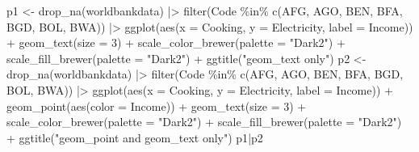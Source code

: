 \documentclass[
  letterpaper,
  DIV=11,
  numbers=noendperiod]{scrreprt}
\newenvironment{Shaded}{\begin{snugshade}}{\end{snugshade}}
\newcommand{\AttributeTok}[1]{\textcolor[rgb]{0.40,0.45,0.13}{#1}}
\newcommand{\DecValTok}[1]{\textcolor[rgb]{0.68,0.00,0.00}{#1}}
\newcommand{\FunctionTok}[1]{\textcolor[rgb]{0.28,0.35,0.67}{#1}}
\newcommand{\NormalTok}[1]{\textcolor[rgb]{0.00,0.23,0.31}{#1}}
\newcommand{\OtherTok}[1]{\textcolor[rgb]{0.00,0.23,0.31}{#1}}
\newcommand{\SpecialCharTok}[1]{\textcolor[rgb]{0.37,0.37,0.37}{#1}}
\newcommand{\StringTok}[1]{\textcolor[rgb]{0.13,0.47,0.30}{#1}}
\begin{document}
\begin{Shaded}
\begin{Highlighting}[]
\NormalTok{p1 }\OtherTok{\textless{}{-}} \FunctionTok{drop\_na}\NormalTok{(worldbankdata) }\SpecialCharTok{|\textgreater{}}
  \FunctionTok{filter}\NormalTok{(Code }\SpecialCharTok{\%in\%} \FunctionTok{c}\NormalTok{(}\StringTok{\textquotesingle{}AFG\textquotesingle{}}\NormalTok{, }\StringTok{\textquotesingle{}AGO\textquotesingle{}}\NormalTok{, }\StringTok{\textquotesingle{}BEN\textquotesingle{}}\NormalTok{, }\StringTok{\textquotesingle{}BFA\textquotesingle{}}\NormalTok{, }\StringTok{\textquotesingle{}BGD\textquotesingle{}}\NormalTok{, }\StringTok{\textquotesingle{}BOL\textquotesingle{}}\NormalTok{, }\StringTok{\textquotesingle{}BWA\textquotesingle{}}\NormalTok{)) }\SpecialCharTok{|\textgreater{}}
  \FunctionTok{ggplot}\NormalTok{(}\FunctionTok{aes}\NormalTok{(}\AttributeTok{x =}\NormalTok{ Cooking, }\AttributeTok{y =}\NormalTok{ Electricity, }\AttributeTok{label =}\NormalTok{ Income)) }\SpecialCharTok{+} \FunctionTok{geom\_text}\NormalTok{(}\AttributeTok{size =} \DecValTok{3}\NormalTok{) }\SpecialCharTok{+} \FunctionTok{scale\_color\_brewer}\NormalTok{(}\AttributeTok{palette =} \StringTok{"Dark2"}\NormalTok{) }\SpecialCharTok{+} \FunctionTok{scale\_fill\_brewer}\NormalTok{(}\AttributeTok{palette =} \StringTok{"Dark2"}\NormalTok{) }\SpecialCharTok{+} \FunctionTok{ggtitle}\NormalTok{(}\StringTok{"geom\_text only"}\NormalTok{)}
\NormalTok{p2 }\OtherTok{\textless{}{-}} \FunctionTok{drop\_na}\NormalTok{(worldbankdata) }\SpecialCharTok{|\textgreater{}}
  \FunctionTok{filter}\NormalTok{(Code }\SpecialCharTok{\%in\%} \FunctionTok{c}\NormalTok{(}\StringTok{\textquotesingle{}AFG\textquotesingle{}}\NormalTok{, }\StringTok{\textquotesingle{}AGO\textquotesingle{}}\NormalTok{, }\StringTok{\textquotesingle{}BEN\textquotesingle{}}\NormalTok{, }\StringTok{\textquotesingle{}BFA\textquotesingle{}}\NormalTok{, }\StringTok{\textquotesingle{}BGD\textquotesingle{}}\NormalTok{, }\StringTok{\textquotesingle{}BOL\textquotesingle{}}\NormalTok{, }\StringTok{\textquotesingle{}BWA\textquotesingle{}}\NormalTok{)) }\SpecialCharTok{|\textgreater{}}
  \FunctionTok{ggplot}\NormalTok{(}\FunctionTok{aes}\NormalTok{(}\AttributeTok{x =}\NormalTok{ Cooking, }\AttributeTok{y =}\NormalTok{ Electricity, }\AttributeTok{label =}\NormalTok{ Income)) }\SpecialCharTok{+} 
  \FunctionTok{geom\_point}\NormalTok{(}\FunctionTok{aes}\NormalTok{(}\AttributeTok{color =}\NormalTok{ Income)) }\SpecialCharTok{+}
  \FunctionTok{geom\_text}\NormalTok{(}\AttributeTok{size =} \DecValTok{3}\NormalTok{) }\SpecialCharTok{+} \FunctionTok{scale\_color\_brewer}\NormalTok{(}\AttributeTok{palette =} \StringTok{"Dark2"}\NormalTok{) }\SpecialCharTok{+} \FunctionTok{scale\_fill\_brewer}\NormalTok{(}\AttributeTok{palette =} \StringTok{"Dark2"}\NormalTok{) }\SpecialCharTok{+} \FunctionTok{ggtitle}\NormalTok{(}\StringTok{"geom\_point and geom\_text only"}\NormalTok{)}
\NormalTok{p1}\SpecialCharTok{|}\NormalTok{p2}
\end{Highlighting}
\end{Shaded}
\end{document}
